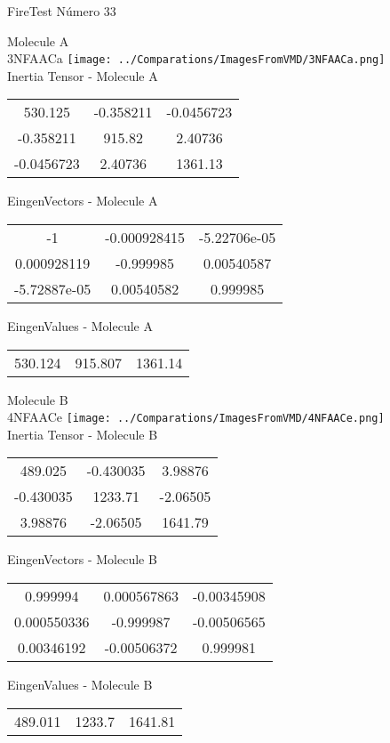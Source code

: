 \vtab[-2cm]
\begin{center}
{\large FireTest \tab Número 33}
\end{center}
\begin{multicols}{2}
\begin{center}

Molecule A \\ 
3NFAACa
\texttt{[image: ../Comparations/ImagesFromVMD/3NFAACa.png]}
\\
Inertia Tensor - Molecule A \\
\vtab

\begin{tabular}{|c c c|}
530.125	 & 	-0.358211	 & 	-0.0456723	 \\
-0.358211	 & 	915.82	 & 	2.40736	 \\
-0.0456723	 & 	2.40736	 & 	1361.13
\end{tabular}

\vtab
 EingenVectors - Molecule A     \\
\vtab
\begin{tabular}{|c c c|}
-1	 & 	-0.000928415	 & 	-5.22706e-05	 \\
0.000928119	 & 	-0.999985	 & 	0.00540587	 \\
-5.72887e-05	 & 	0.00540582	 & 	0.999985
\end{tabular}

\vtab
 EingenValues - Molecule A     \\
\vtab
\begin{tabular}{|c c c|}
530.124	 & 	915.807	 & 	1361.14	 \\
\end{tabular}
\columnbreak

Molecule B \\ 
4NFAACe
\texttt{[image: ../Comparations/ImagesFromVMD/4NFAACe.png]}
\\
Inertia Tensor - Molecule B \\
\vtab

\begin{tabular}{|c c c|}
489.025	 & 	-0.430035	 & 	3.98876	 \\
-0.430035	 & 	1233.71	 & 	-2.06505	 \\
3.98876	 & 	-2.06505	 & 	1641.79
\end{tabular}

\vtab
 EingenVectors - Molecule B     \\
\vtab
\begin{tabular}{|c c c|}
0.999994	 & 	0.000567863	 & 	-0.00345908	 \\
0.000550336	 & 	-0.999987	 & 	-0.00506565	 \\
0.00346192	 & 	-0.00506372	 & 	0.999981
\end{tabular}

\vtab
 EingenValues - Molecule B     \\
\vtab
\begin{tabular}{|c c c|}
489.011	 & 	1233.7	 & 	1641.81	 \\
\end{tabular}

\end{center}
\end{multicols}
